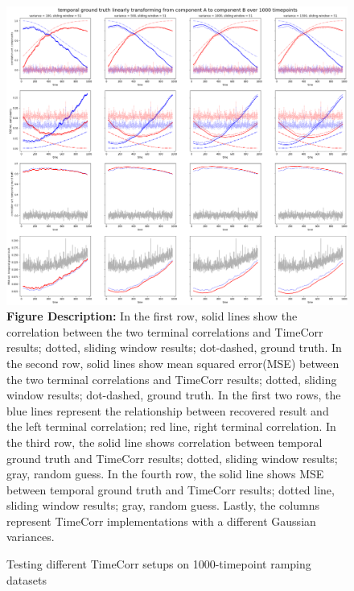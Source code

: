\documentclass[11pt]{article}
\begin{document}
\begin{figure}[!htb]
\caption{Testing different TimeCorr setups on 1000-timepoint ramping datasets}
\includegraphics[width=1\textwidth]{../figures/SyntheticTesting/ramp1000t4var.png}
\label{fig:ramp1000t4var}
\small{\textbf{Figure Description:} In the first row, solid lines show the correlation between the two terminal correlations and TimeCorr results; dotted, sliding window results; dot-dashed, ground truth. In the second row, solid lines show mean squared error(MSE) between the two terminal correlations and TimeCorr results; dotted, sliding window results; dot-dashed, ground truth. In the first two rows, the blue lines represent the relationship between recovered result and the left terminal correlation; red line, right terminal correlation. In the third row, the solid line shows correlation between temporal ground truth and TimeCorr results; dotted, sliding window results; gray, random guess. In the fourth row, the solid line shows MSE between temporal ground truth and TimeCorr results; dotted line, sliding window results; gray, random guess. Lastly, the columns represent TimeCorr implementations with a different Gaussian variances.}
\end{figure}
\end{document}
